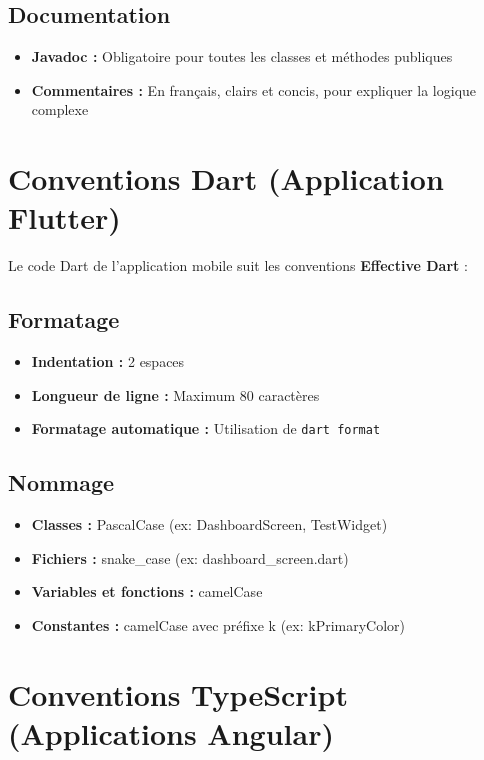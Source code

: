 \documentclass[12pt,a4paper]{report}
\begin{document}
\subsection{Documentation}

\begin{itemize}
    \item \textbf{Javadoc :} Obligatoire pour toutes les classes et méthodes publiques
    \item \textbf{Commentaires :} En français, clairs et concis, pour expliquer la logique complexe
\end{itemize}

\section{Conventions Dart (Application Flutter)}

Le code Dart de l'application mobile suit les conventions \textbf{Effective Dart} :

\subsection{Formatage}

\begin{itemize}
    \item \textbf{Indentation :} 2 espaces
    \item \textbf{Longueur de ligne :} Maximum 80 caractères
    \item \textbf{Formatage automatique :} Utilisation de \texttt{dart format}
\end{itemize}

\subsection{Nommage}

\begin{itemize}
    \item \textbf{Classes :} PascalCase (ex: DashboardScreen, TestWidget)
    \item \textbf{Fichiers :} snake\_case (ex: dashboard\_screen.dart)
    \item \textbf{Variables et fonctions :} camelCase
    \item \textbf{Constantes :} camelCase avec préfixe k (ex: kPrimaryColor)
\end{itemize}

\section{Conventions TypeScript (Applications Angular)}
\end{document}
